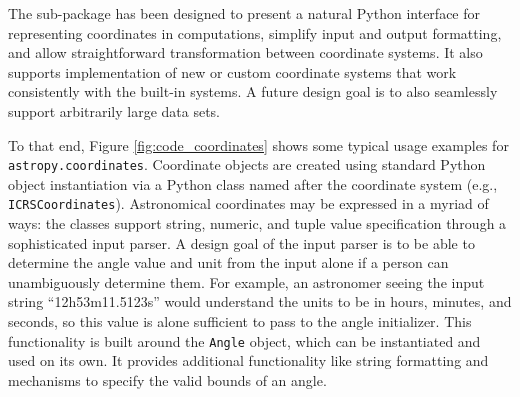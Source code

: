\documentclass[traditabstract]{aa}
\begin{document}
The sub-package has been designed to present a natural Python interface for
representing coordinates in computations, simplify input and output formatting,
and allow straightforward transformation between coordinate systems. It also
supports implementation of new or custom coordinate systems that work
consistently with the built-in systems. A future design goal is to also
seamlessly support arbitrarily large data sets.

To that end, Figure \ref{fig:code_coordinates} shows some typical usage
examples for \texttt{astropy.coordinates}. Coordinate objects are created using
standard Python object instantiation via a Python class named after the
coordinate system (e.g., \texttt{ICRSCoordinates}). Astronomical coordinates
may be expressed in a myriad of ways: the classes support string, numeric, and
tuple value specification through a sophisticated input parser. A design goal
of the input parser is to be able to determine the angle value and unit from
the input alone if a person can unambiguously determine them. For example, an
astronomer seeing the input string ``12h53m11.5123s'' would understand the
units to be in hours, minutes, and seconds, so this value is alone sufficient
to pass to the angle initializer. This functionality is built around the
\texttt{Angle} object, which can be instantiated and used on its own. It
provides additional functionality like string formatting and mechanisms to
specify the valid bounds of an angle.
\end{document}

